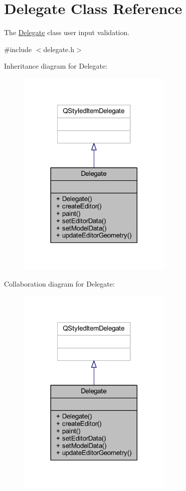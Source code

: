 \hypertarget{class_delegate}{}\section{Delegate Class Reference}
\label{class_delegate}


The \hyperlink{class_delegate}{Delegate} class user input validation.  




{\ttfamily \#include $<$delegate.\+h$>$}



Inheritance diagram for Delegate\+:
\nopagebreak
\begin{figure}[H]
\begin{center}
\leavevmode
\includegraphics[width=209pt]{class_delegate__inherit__graph}
\end{center}
\end{figure}


Collaboration diagram for Delegate\+:
\nopagebreak
\begin{figure}[H]
\begin{center}
\leavevmode
\includegraphics[width=209pt]{class_delegate__coll__graph}
\end{center}
\end{figure}
